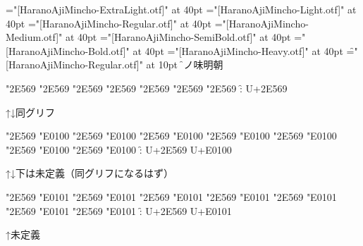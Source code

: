 \def\testb{%
\fonta\char"2E569
\fontb\char"2E569
\fontc\char"2E569
\fontd\char"2E569
\fonte\char"2E569
\fontf\char"2E569
\fontg\char"2E569
\f : U+2E569\par
↑↓同グリフ\par
\fonta\char"2E569 \char"E0100
\fontb\char"2E569 \char"E0100
\fontc\char"2E569 \char"E0100
\fontd\char"2E569 \char"E0100
\fonte\char"2E569 \char"E0100
\fontf\char"2E569 \char"E0100
\fontg\char"2E569 \char"E0100
\f : U+2E569 U+E0100\par
↑↓下は未定義（同グリフになるはず）\par
\fonta\char"2E569 \char"E0101
\fontb\char"2E569 \char"E0101
\fontc\char"2E569 \char"E0101
\fontd\char"2E569 \char"E0101
\fonte\char"2E569 \char"E0101
\fontf\char"2E569 \char"E0101
\fontg\char"2E569 \char"E0101
\f : U+2E569 U+E0101\par
↑未定義\par}

\vfill

\font\fonta="[HaranoAjiMincho-ExtraLight.otf]" at 40pt
\font\fontb="[HaranoAjiMincho-Light.otf]" at 40pt
\font\fontc="[HaranoAjiMincho-Regular.otf]" at 40pt
\font\fontd="[HaranoAjiMincho-Medium.otf]" at 40pt
\font\fonte="[HaranoAjiMincho-SemiBold.otf]" at 40pt
\font\fontf="[HaranoAjiMincho-Bold.otf]" at 40pt
\font\fontg="[HaranoAjiMincho-Heavy.otf]" at 40pt
\font\f="[HaranoAjiMincho-Regular.otf]" at 10pt
\f 原ノ味明朝\par
\testb

\bye
